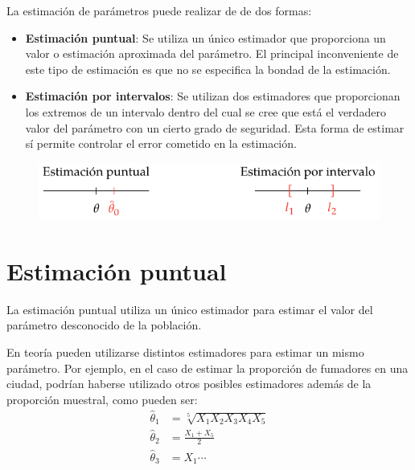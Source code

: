 \documentclass[
  a4paper,
]{scrreport}
\providecommand{\tightlist}{%
  \setlength{\itemsep}{0pt}\setlength{\parskip}{0pt}}\usepackage{longtable,booktabs,array}
\theoremstyle{plain}
\theoremstyle{definition}
\theoremstyle{definition}
\theoremstyle{remark}
\begin{document}
La estimación de parámetros puede realizar de de dos formas:

\begin{itemize}
\tightlist
\item
  \textbf{Estimación puntual}: Se utiliza un único estimador que
  proporciona un valor o estimación aproximada del parámetro. El
  principal inconveniente de este tipo de estimación es que no se
  especifica la bondad de la estimación.
\item
  \textbf{Estimación por intervalos}: Se utilizan dos estimadores que
  proporcionan los extremos de un intervalo dentro del cual se cree que
  está el verdadero valor del parámetro con un cierto grado de
  seguridad. Esta forma de estimar sí permite controlar el error
  cometido en la estimación.
\end{itemize}

\begin{figure}

{\centering \includegraphics[width=1\textwidth,height=\textheight]{img/estimacion/estimacion-puntual-intervalo.pdf}

}

\end{figure}

\hypertarget{estimaciuxf3n-puntual}{%
\section{Estimación puntual}\label{estimaciuxf3n-puntual}}

La estimación puntual utiliza un único estimador para estimar el valor
del parámetro desconocido de la población.

En teoría pueden utilizarse distintos estimadores para estimar un mismo
parámetro. Por ejemplo, en el caso de estimar la proporción de fumadores
en una ciudad, podrían haberse utilizado otros posibles estimadores
además de la proporción muestral, como pueden ser: \begin{align*}
\hat \theta_1 &= \sqrt[5]{X_1X_2X_3X_4X_5}\\
\hat \theta_2 &= \frac{X_1+X_5}{2}\\
\hat \theta_3 &= X_1 \cdots
\end{align*}
\end{document}
